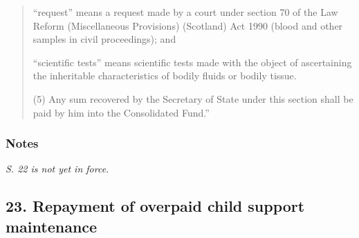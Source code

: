 \documentclass[a4paper]{article}
\newcommand\amendment[1]{\subsubsection*{Notes}{\itshape\frenchspacing\footnotesize #1 \par}}
\begin{document}
\begin{quotation}
\begin{enumerate}
“request” means a request made by a court under section 70 of the Law Reform (Miscellaneous Provisions) (Scotland) Act 1990 (blood and other samples in civil proceedings); and

“scientific tests” means scientific tests made with the object of ascertaining the inheritable characteristics of bodily fluids or bodily tissue.
\end{enumerate}

(5) Any sum recovered by the Secretary of State under this section shall be paid by him into the Consolidated Fund.”
\end{quotation}

\amendment{
S. 22 is not yet in force.
}


\subsection{23. Repayment of overpaid child support maintenance}
\end{document}
